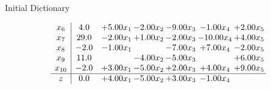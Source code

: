 \documentclass[8pt]{article}
\begin{document}
Initial Dictionary 

\[\begin{array}{c| c c@{\hskip 2pt} c@{\hskip 2pt} c@{\hskip 2pt} c@{\hskip 2pt} c@{\hskip 2pt} }
 x_{6}   &  4.0 & +  5.00 x_{1} & -2.00 x_{2} & -9.00 x_{3} & -1.00 x_{4} & +  2.00 x_{5}\\
 x_{7}   &  29.0 & -2.00 x_{1} & +  1.00 x_{2} & -2.00 x_{3} & -10.00 x_{4} & +  4.00 x_{5}\\
 x_{8}   &  -2.0 & -1.00 x_{1} &   & -7.00 x_{3} & +  7.00 x_{4} & -2.00 x_{5}\\
 x_{9}   &  11.0  &   & -4.00 x_{2} & -5.00 x_{3} &   & +  6.00 x_{5}\\
 x_{10}   &  -2.0 & +  3.00 x_{1} & -5.00 x_{2} & +  2.00 x_{3} & +  4.00 x_{4} & +  9.00 x_{5}\\
\hline
z    &  0.0 & +  4.00 x_{1} & -5.00 x_{2} & +  3.00 x_{3} & -1.00 x_{4} &   \\
\end{array}\]
\end{document}
